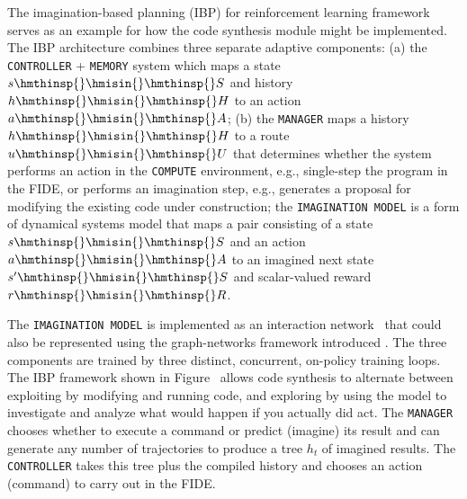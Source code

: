 
The imagination-based planning (IBP) for reinforcement learning framework~\cite{PascanuetalCoRR-17} serves as an example for how the code synthesis module might be implemented. The IBP architecture combines three separate adaptive components: (a) the {\tt{CONTROLLER}} + {\tt{MEMORY}} system which maps a state $s\hmthinsp{}\hmisin{}\hmthinsp{}S$ and history $h\hmthinsp{}\hmisin{}\hmthinsp{}H$ to an action $a\hmthinsp{}\hmisin{}\hmthinsp{}A$; (b) the {\tt{MANAGER}} maps a history $h\hmthinsp{}\hmisin{}\hmthinsp{}H$ to a route $u\hmthinsp{}\hmisin{}\hmthinsp{}U$ that determines whether the system performs an action in the {\tt{COMPUTE}} environment, e.g., single-step the program in the FIDE, or performs an imagination step, e.g., generates a proposal for modifying the existing code under construction; the {\tt{IMAGINATION MODEL}} is a form of dynamical systems model that maps a pair consisting of a state $s\hmthinsp{}\hmisin{}\hmthinsp{}S$ and an action $a\hmthinsp{}\hmisin{}\hmthinsp{}A$ to an imagined next state $s'\hmthinsp{}\hmisin{}\hmthinsp{}S$ and scalar-valued reward $r\hmthinsp{}\hmisin{}\hmthinsp{}R$.

The {\tt{IMAGINATION MODEL}} is implemented as an interaction network~\cite{BattagliaetalNIPS-16} that could also be represented using the graph-networks framework introduced {}. The three components are trained by three distinct, concurrent, on-policy training loops. The IBP framework shown in Figure~{} allows code synthesis to alternate between exploiting by modifying and running code, and exploring by using the model to investigate and analyze what would happen if you actually did act. The {\tt{MANAGER}} chooses whether to execute a command or predict (imagine) its result and can generate any number of trajectories to produce a tree $h_t$ of imagined results. The {\tt{CONTROLLER}} takes this tree plus the compiled history and chooses an action (command) to carry out in the FIDE.


\setcounter{figure}{61}


